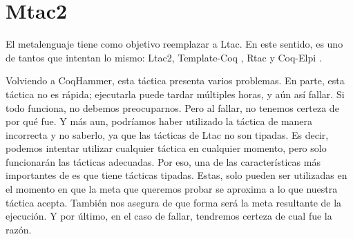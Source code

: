\section{Mtac2}

El metalenguaje \Mtac \cite{DBLP:journals/pacmpl/KaiserZKRD18} tiene como objetivo reemplazar a Ltac.
En este sentido, es uno de tantos que intentan lo mismo: Ltac2, Template-Coq \cite{DBLP:conf/itp/AnandBCST18}, Rtac \cite{DBLP:conf/esop/MalechaB16} y Coq-Elpi \cite{tassi:hal-01637063}.

Volviendo a CoqHammer, esta táctica presenta varios problemas.
En parte, esta táctica no es rápida; ejecutarla puede tardar múltiples horas, y aún así fallar.
Si todo funciona, no debemos preocuparnos.
Pero al fallar, no tenemos certeza de por qué fue.
Y más aun, podríamos haber utilizado la táctica de manera incorrecta y no saberlo, ya que las tácticas de Ltac no son tipadas.
Es decir, podemos intentar utilizar cualquier táctica en cualquier momento, pero solo funcionarán las tácticas adecuadas.
Por eso, una de las características más importantes de \mtac es que tiene tácticas tipadas.
Estas, solo pueden ser utilizadas en el momento en que la meta que queremos probar se aproxima a lo que nuestra táctica acepta.
También nos asegura de que forma será la meta resultante de la ejecución.
Y por último, en el caso de fallar, tendremos certeza de cual fue la razón.

